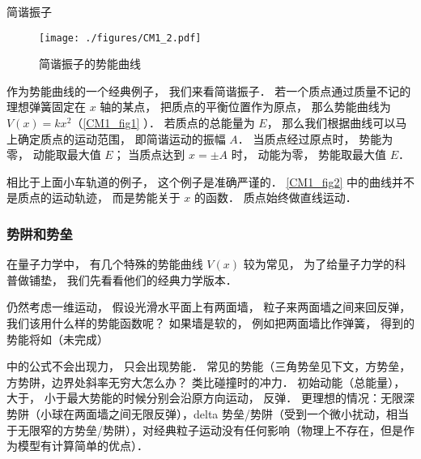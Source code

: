 
\begin{example}{简谐振子}\label{CM1_ex1}
\begin{figure}[ht]
\centering
\texttt{[image: ./figures/CM1\_2.pdf]}
\caption{简谐振子的势能曲线} \label{CM1_fig2}
\end{figure}

作为势能曲线的一个经典例子， 我们来看简谐振子． 若一个质点通过质量不记的理想弹簧固定在 $x$ 轴的某点， 把质点的平衡位置作为原点， 那么势能曲线为 $V(x) = kx^2$（\autoref{CM1_fig1} ）． 若质点的总能量为 $E$， 那么我们根据曲线可以马上确定质点的运动范围， 即简谐运动的振幅 $A$． 当质点经过原点时， 势能为零， 动能取最大值 $E$； 当质点达到 $x = \pm A$ 时， 动能为零， 势能取最大值 $E$．
\end{example}
相比于上面小车轨道的例子， 这个例子是准确严谨的． \autoref{CM1_fig2} 中的曲线并不是质点的运动轨迹， 而是势能关于 $x$ 的函数． 质点始终做直线运动．

\subsubsection{势阱和势垒}
在量子力学中， 有几个特殊的势能曲线 $V(x)$ 较为常见， 为了给量子力学的科普做铺垫， 我们先看看他们的经典力学版本．



仍然考虑一维运动， 假设光滑水平面上有两面墙， 粒子来两面墙之间来回反弹， 我们该用什么样的势能函数呢？ 如果墙是软的， 例如把两面墙比作弹簧， 得到的势能将如（未完成）

中的公式不会出现力， 只会出现势能． 常见的势能（三角势垒见下文，方势垒，方势阱，边界处斜率无穷大怎么办？ 类比碰撞时的冲力． 初始动能（总能量）， 大于， 小于最大势能的时候分别会沿原方向运动， 反弹． 更理想的情况：无限深势阱（小球在两面墙之间无限反弹），delta 势垒/势阱（受到一个微小扰动，相当于无限窄的方势垒/势阱），对经典粒子运动没有任何影响（物理上不存在，但是作为模型有计算简单的优点）．

